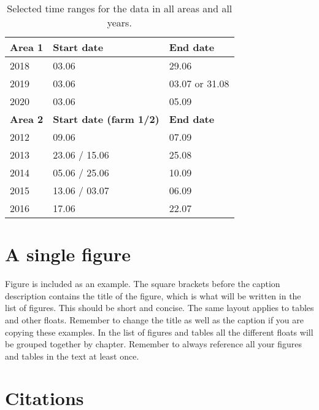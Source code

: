 \begin{table}[ht!]
\centering
    \begin{tabular}{ m{3cm} m{5cm} m{3cm} } 
    \toprule
    \toprule
    \textbf{Area 1} & \textbf{Start date} & \textbf{End date} \\
    \midrule
    2018    & 03.06    & 29.06                       \\[1.3ex]
    2019    & 03.06    & 03.07 or 31.08\footnotemark \\[1.3ex]
    2020    & 03.06    & 05.09                       \\[1.3ex]
    \midrule
    \textbf{Area 2} & \textbf{Start date (farm 1/2)} & \textbf{End date} \\
    \midrule
    2012    & 09.06            & 07.09               \\[1.3ex]
    2013    & 23.06 / 15.06    & 25.08               \\[1.3ex]
    2014    & 05.06 / 25.06    & 10.09               \\[1.3ex]
    2015    & 13.06 / 03.07    & 06.09               \\[1.3ex]
    2016    & 17.06            & 22.07               \\[1.3ex]
    \bottomrule
    \bottomrule
    \end{tabular}
\caption[Selected time ranges for all data]{Selected time ranges for the data in all areas and all years.}
\label{table:time_ranges}
\end{table}




\section{A single figure}

Figure is included as an example. The square brackets before the caption description contains the title of the figure, which is what will be written in the list of figures. This should be short and concise. The same layout applies to tables and other floats. Remember to change the title as well as the caption if you are copying these examples. In the list of figures and tables all the different floats will be grouped together by chapter. Remember to always reference all your figures and tables in the text at least once.

\section{Citations}

